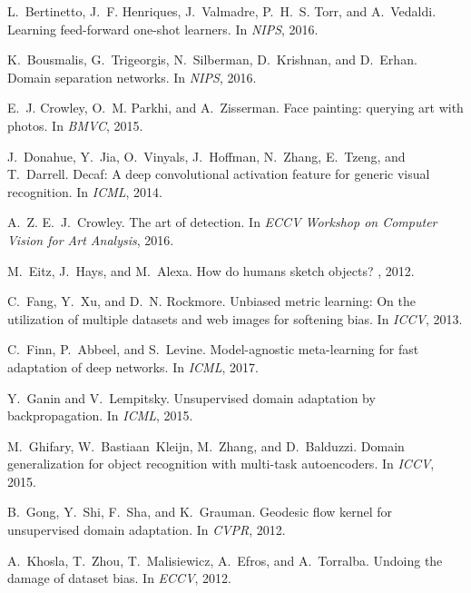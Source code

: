 \documentclass[10pt,twocolumn,letterpaper]{article}
\begin{document}
{\small
\begin{thebibliography}{10}\itemsep=-1pt

L.~Bertinetto, J.~F. Henriques, J.~Valmadre, P.~H.~S. Torr, and A.~Vedaldi.
\newblock Learning feed-forward one-shot learners.
\newblock In {\em NIPS}, 2016.

K.~Bousmalis, G.~Trigeorgis, N.~Silberman, D.~Krishnan, and D.~Erhan.
\newblock Domain separation networks.
\newblock In {\em NIPS}, 2016.

E.~J. Crowley, O.~M. Parkhi, and A.~Zisserman.
\newblock Face painting: querying art with photos.
\newblock In {\em BMVC}, 2015.

J.~Donahue, Y.~Jia, O.~Vinyals, J.~Hoffman, N.~Zhang, E.~Tzeng, and T.~Darrell.
\newblock Decaf: A deep convolutional activation feature for generic visual
  recognition.
\newblock In {\em ICML}, 2014.

A.~Z. E.~J.~Crowley.
\newblock The art of detection.
\newblock In {\em ECCV Workshop on Computer Vision for Art Analysis}, 2016.

M.~Eitz, J.~Hays, and M.~Alexa.
\newblock How do humans sketch objects?
, 2012.

C.~Fang, Y.~Xu, and D.~N. Rockmore.
\newblock Unbiased metric learning: On the utilization of multiple datasets and
  web images for softening bias.
\newblock In {\em ICCV}, 2013.

C.~Finn, P.~Abbeel, and S.~Levine.
\newblock Model-agnostic meta-learning for fast adaptation of deep networks.
\newblock In {\em ICML}, 2017.

Y.~Ganin and V.~Lempitsky.
\newblock Unsupervised domain adaptation by backpropagation.
\newblock In {\em ICML}, 2015.

M.~Ghifary, W.~Bastiaan~Kleijn, M.~Zhang, and D.~Balduzzi.
\newblock Domain generalization for object recognition with multi-task
  autoencoders.
\newblock In {\em ICCV}, 2015.

B.~Gong, Y.~Shi, F.~Sha, and K.~Grauman.
\newblock Geodesic flow kernel for unsupervised domain adaptation.
\newblock In {\em CVPR}, 2012.

A.~Khosla, T.~Zhou, T.~Malisiewicz, A.~Efros, and A.~Torralba.
\newblock Undoing the damage of dataset bias.
\newblock In {\em ECCV}, 2012.


\end{thebibliography}}
\end{document}
